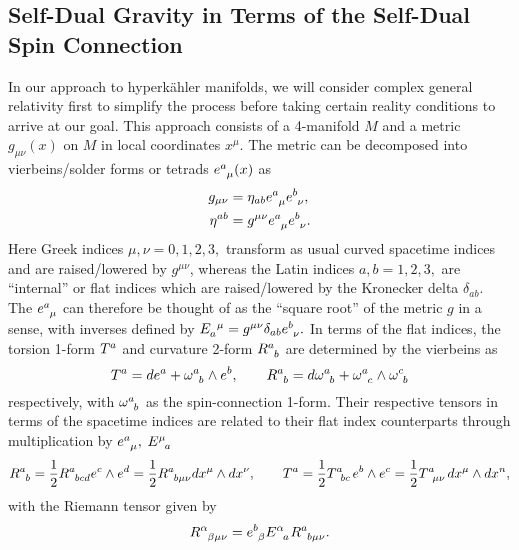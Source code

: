 \documentclass[a4paper,12pt, onecolumn, notitlepage]{article}
\theoremstyle{definition}
\theoremstyle{remark}
\newcommand{\al}{\alpha}
\newcommand{\w}{\omega}
\newcommand{\m}{\mu}
\newcommand{\n}{\nu}
\newcommand{\HK}{hyperk\"ahler }
\begin{document}
\subsection{Self-Dual Gravity in Terms of the Self-Dual Spin Connection}
In our approach to \HK manifolds, we will consider complex general relativity first to simplify the process before taking certain reality conditions to arrive at our goal. This approach consists of a 4-manifold $M$ and a metric $g_{\m\n}(x)$ on $M$ in local coordinates $x^{\m}.$ The metric can be decomposed into vierbeins/solder forms or tetrads $e\indices{^a_\m}(x)$ as
\begin{align*}
	g_{\m\n} &= \eta_{ab}e\indices{^a_\m}e\indices{^b_\n},\\
	\eta^{ab} &= g^{\m\n}e\indices{^a_\m}e\indices{^b_\n}.
\end{align*}
Here Greek indices $\m,\n=0,1,2,3,$ transform as usual curved spacetime indices and are raised/lowered by $g^{\m\n}$, whereas the Latin indices $a,b=1,2,3,$ are ``internal'' or flat indices which are raised/lowered by the Kronecker delta $\delta_{ab}$. The $e\indices{^a_\m}$ can therefore be thought of as the ``square root'' of the metric $g$ in a sense, with inverses defined by $E\indices{_a^{\m}} = g^{\m\n}\delta_{ab}e\indices{^b_\n}.$ In terms of the flat indices, the torsion 1-form $T\indices{^a}$ and curvature 2-form $R\indices{^a_b}$ are determined by the vierbeins as
\begin{equation}
	T\indices{^a} = de\indices{^a} + \w\indices{^a_b}\wedge e\indices{^b},\qquad R\indices{^a_b} = d\w\indices{^a_b} + \w\indices{^a_c}\wedge\w\indices{^c_b}
\end{equation}
respectively, with $\w\indices{^a_b}$ as the spin-connection 1-form. Their respective tensors in terms of the spacetime indices are related to their flat index counterparts through multiplication by $e\indices{^a_\m},$ $E\indices{^\m_a}$
\begin{equation}
R\indices{^a_b}=\frac{1}{2}R\indices{^a_b_c_d}e\indices{^c}\wedge e\indices{^d}=\frac{1}{2}R\indices{^a_b_\m_\n}dx\indices{^\m}\wedge dx\indices{^\n},\qquad T\indices{^a} = \frac{1}{2}T\indices{^a_b_c}e\indices{^b}\wedge e\indices{^c}=\frac{1}{2}T\indices{^a_\m_\n}dx\indices{^\m}\wedge dx\indices{^n},
\end{equation}
with the Riemann tensor given by
\begin{equation}
	\label{riemann}
	R\indices{^\al_\beta_\mu_\n} = e\indices{^b_\beta}E\indices{^\al_a}R\indices{^a_b_\m_\n}.
\end{equation}
\end{document}
